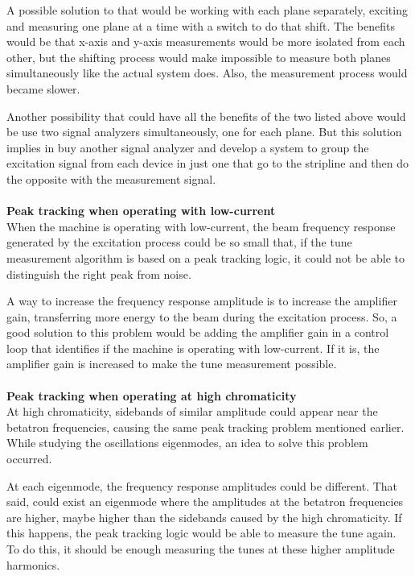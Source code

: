 A possible solution to that would be working with each plane separately, exciting and measuring one plane at a time with a switch to do that shift. The benefits would be that x-axis and y-axis measurements would be more isolated from each other, but the shifting process would make impossible to measure both planes simultaneously like the actual system does. Also, the measurement process would became slower.

Another possibility that could have all the benefits of the two listed above would be use two signal analyzers simultaneously, one for each plane. But this solution implies in buy another signal analyzer and develop a system to group the excitation signal from each device in just one that go to the stripline and then do the opposite with the measurement signal.\\ \\

\noindent
\textbf{Peak tracking when operating with low-current}\\

When the machine is operating with low-current, the beam frequency response generated by the excitation process could be so small that, if the tune measurement algorithm is based on a peak tracking logic, it could not be able to distinguish the right peak from noise.

A way to increase the frequency response amplitude is to increase the amplifier gain, transferring more energy to the beam during the excitation process. So, a good solution to this problem would be adding the amplifier gain in a control loop that identifies if the machine is operating with low-current. If it is, the amplifier gain is increased to make the tune measurement possible.\\ \\

\noindent
\textbf{Peak tracking when operating at high chromaticity}\\

At high chromaticity, sidebands of similar amplitude could appear near the betatron frequencies, causing the same peak tracking problem mentioned earlier. While studying the oscillations eigenmodes, an idea to solve this problem occurred.

At each eigenmode, the frequency response amplitudes could be different. That said, could exist an eigenmode where the amplitudes at the betatron frequencies are higher, maybe higher than the sidebands caused by the high chromaticity. If this happens, the peak tracking logic would be able to measure the tune again. To do this, it should be enough measuring the tunes at these higher amplitude harmonics.

\pagebreak